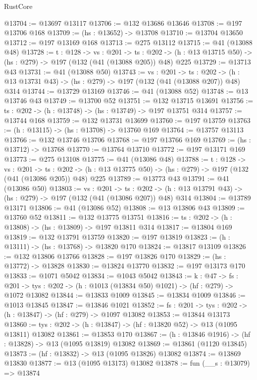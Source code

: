 \begin{lexlean}{RustCore}
\begin{coremodule}
@13704 := @13697 @13117
@13706 := @132 @13686 @13646
@13708 := @197 @13706 @168
@13709 := (hs : @13652) -> @13708
@13710 := @13704 @13650
@13712 := @197 @13169 @168
@13713 := @275 @13112
@13715 := @41 (@13088 @48)
@13728 := {t : @128} ->
  {vs : @201} ->
  {ts : @202} -> (h : @13 @13715 @50) -> (hs : @279) -> @197 (@132 (@41 (@13088 @205)) @48) @225
@13729 := @13713 @43
@13731 := @41 (@13088 @50)
@13743 := {vs : @201} ->
  {ts : @202} -> (h : @13 @13731 @43) -> (hs : @279) -> @197 (@132 (@41 (@13088 @207)) @48) @314
@13744 := @13729 @13169
@13746 := @41 (@13088 @52)
@13748 := @13 @13746 @43
@13749 := @13700 @52
@13751 := @132 @13715 @13691
@13756 := {ts : @202} -> (h : @13748) -> (hs : @13749) -> @197 @13751 @314
@13757 := @13744 @168
@13759 := @132 @13731 @13699
@13760 := @197 @13759
@13763 := (h : @13115) -> (hs : @13708) -> @13760 @169
@13764 := @13757 @13113
@13766 := @132 @13746 @13706
@13768 := @197 @13766 @169
@13769 := (hs : @13712) -> @13768
@13770 := @13764 @13710
@13772 := @197 @13171 @169
@13773 := @275 @13108
@13775 := @41 (@13086 @48)
@13788 := {t : @128} ->
  {vs : @201} ->
  {ts : @202} -> (h : @13 @13775 @50) -> (hs : @279) -> @197 (@132 (@41 (@13086 @205)) @48) @225
@13789 := @13773 @43
@13791 := @41 (@13086 @50)
@13803 := {vs : @201} ->
  {ts : @202} -> (h : @13 @13791 @43) -> (hs : @279) -> @197 (@132 (@41 (@13086 @207)) @48) @314
@13804 := @13789 @13171
@13806 := @41 (@13086 @52)
@13808 := @13 @13806 @43
@13809 := @13760 @52
@13811 := @132 @13775 @13751
@13816 := {ts : @202} -> (h : @13808) -> (hs : @13809) -> @197 @13811 @314
@13817 := @13804 @169
@13819 := @132 @13791 @13759
@13820 := @197 @13819
@13823 := (h : @13111) -> (hs : @13768) -> @13820 @170
@13824 := @13817 @13109
@13826 := @132 @13806 @13766
@13828 := @197 @13826 @170
@13829 := (hs : @13772) -> @13828
@13830 := @13824 @13770
@13832 := @197 @13173 @170
@13833 := @1071 @5042
@13834 := @1043 @5042
@13843 := {k : @47} ->
  {fs : @201} -> {tys : @202} -> (h : @1013 (@13834 @50) @1021) -> (hf : @279) -> @1072 @13082
@13844 := @13833 @1009
@13845 := @13834 @1009
@13846 := @1013 @13845
@13847 := @13846 @1021
@13852 := {fs : @201} -> {tys : @202} -> (h : @13847) -> (hf : @279) -> @1097 @13082
@13853 := @13844 @13173
@13860 := {tys : @202} -> (h : @13847) -> (hf : @13820 @52) -> @13 (@1095 @13811) @13082
@13861 := @13853 @170
@13867 := (h : @13846 @1916) -> (hf : @13828) -> @13 (@1095 @13819) @13082
@13869 := @13861 (@1120 @13845)
@13873 := (hf : @13832) -> @13 (@1095 @13826) @13082
@13874 := @13869 @13830
@13877 := @13 (@1095 @13173) @13082
@13878 := fun (__s : @13079) => @13874

\end{coremodule}
\end{lexlean}
